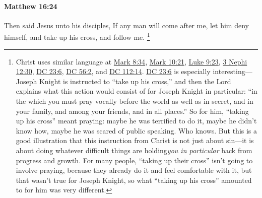 		\paragraph{Matthew 16:24} %
			\label{MATTHEW-16-24}

			Then said Jesus unto his disciples, If any man will come after me, let him deny himself, and take up his cross, and follow me.%
			\footnote{%
				Christ uses similar language at \hyperref[MARK-8-34]{Mark 8:34}, \hyperref[MARK-10-21]{Mark 10:21}, \hyperref[LUKE-9-23]{Luke 9:23}, \hyperref[3NEPHI-12-30]{3 Nephi 12:30}, \hyperref[DC23-6]{DC 23:6}, \hyperref[DC56-2]{DC 56:2}, and \hyperref[DC112-14]{DC 112:14}. \hyperref[DC23-6]{DC 23:6} is especially interesting---Joseph Knight is instructed to ``take up his cross,'' and then the Lord explains what this action would consist of for Joseph Knight in particular: ``in the which you must pray vocally before the world as well as in secret, and in your family, and among your friends, and in all places.'' So for him, ``taking up his cross'' meant praying: maybe he was terrified to do it, maybe he didn't know how, maybe he was scared of public speaking. Who knows. But this is a good illustration that this instruction from Christ is not just about sin---it is about doing whatever difficult things are holding\textit{you in particular} back from progress and growth. For many people, ``taking up their cross'' isn't going to involve praying, because they already do it and feel comfortable with it, but that wasn't true for Joseph Knight, so what ``taking up his cross'' amounted to for him was very different.
				} 

			\begin{framed}
			\scriptsize
				\begin{compactdesc}
					\item[SBLG] 
				\end{compactdesc}
			\end{framed}

